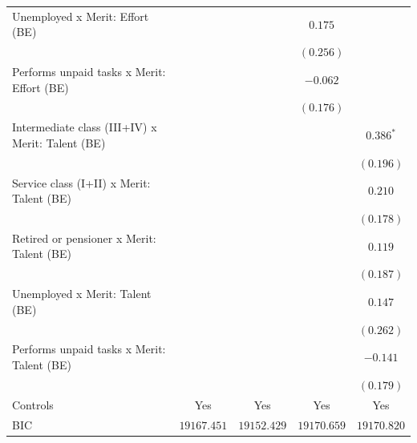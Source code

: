 \documentclass[
  12pt,
]{article}
\begin{document}
\begin{table}
\begin{center}
{\begin{tabular}{l c c c c}
\quad Unemployed x Merit: Effort (BE)                           &             &             & $0.175$     &             \\
                                                                &             &             & $(0.256)$   &             \\
\quad Performs unpaid tasks x Merit: Effort (BE)                &             &             & $-0.062$    &             \\
                                                                &             &             & $(0.176)$   &             \\
\quad Intermediate class (III+IV) x Merit: Talent (BE)          &             &             &             & $0.386^{*}$ \\
                                                                &             &             &             & $(0.196)$   \\
\quad Service class (I+II) x Merit: Talent (BE)                 &             &             &             & $0.210$     \\
                                                                &             &             &             & $(0.178)$   \\
\quad Retired or pensioner x Merit: Talent (BE)                 &             &             &             & $0.119$     \\
                                                                &             &             &             & $(0.187)$   \\
\quad Unemployed x Merit: Talent (BE)                           &             &             &             & $0.147$     \\
                                                                &             &             &             & $(0.262)$   \\
\quad Performs unpaid tasks x Merit: Talent (BE)                &             &             &             & $-0.141$    \\
                                                                &             &             &             & $(0.179)$   \\
\hline
Controls                                                        & Yes         & Yes         & Yes         & Yes         \\
BIC                                                             & $19167.451$ & $19152.429$ & $19170.659$ & $19170.820$ \\

\end{tabular}}
\end{center}
\end{table}
\end{document}
